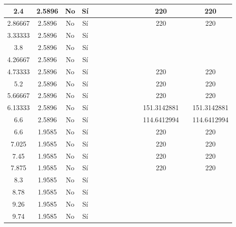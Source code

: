 \begin{table}[H]
{\begin{tabular}{|c|c|c|c|c|c|c|c|c|c|c|c|c|c|}
\hline
2.4 & 2.5896 & No  & Sí  &     &     &     &     &     &     &     & 220 &     & 220 \bigstrut\\
\hline
2.86667 & 2.5896 & No  & Sí  &     &     &     &     &     &     &     & 220 &     & 220 \bigstrut\\
\hline
3.33333 & 2.5896 & No  & Sí  &     &     &     &     &     &     &     &     &     &  \bigstrut\\
\hline
3.8 & 2.5896 & No  & Sí  &     &     &     &     &     &     &     &     &     &  \bigstrut\\
\hline
4.26667 & 2.5896 & No  & Sí  &     &     &     &     &     &     &     &     &     &  \bigstrut\\
\hline
4.73333 & 2.5896 & No  & Sí  &     &     &     &     &     &     &     & 220 &     & 220 \bigstrut\\
\hline
5.2 & 2.5896 & No  & Sí  &     &     &     &     &     &     &     & 220 &     & 220 \bigstrut\\
\hline
5.66667 & 2.5896 & No  & Sí  &     &     &     &     &     &     &     & 220 &     & 220 \bigstrut\\
\hline
6.13333 & 2.5896 & No  & Sí  &     &     &     &     &     &     &     & 151.3142881 &     & 151.3142881 \bigstrut\\
\hline
6.6 & 2.5896 & No  & Sí  &     &     &     &     &     &     &     & 114.6412994 &     & 114.6412994 \bigstrut\\
\hline
6.6 & 1.9585 & No  & Sí  &     &     &     &     &     &     &     & 220 &     & 220 \bigstrut\\
\hline
7.025 & 1.9585 & No  & Sí  &     &     &     &     &     &     &     & 220 &     & 220 \bigstrut\\
\hline
7.45 & 1.9585 & No  & Sí  &     &     &     &     &     &     &     & 220 &     & 220 \bigstrut\\
\hline
7.875 & 1.9585 & No  & Sí  &     &     &     &     &     &     &     & 220 &     & 220 \bigstrut\\
\hline
8.3 & 1.9585 & No  & Sí  &     &     &     &     &     &     &     &     &     &  \bigstrut\\
\hline
8.78 & 1.9585 & No  & Sí  &     &     &     &     &     &     &     &     &     &  \bigstrut\\
\hline
9.26 & 1.9585 & No  & Sí  &     &     &     &     &     &     &     &     &     &  \bigstrut\\
\hline
9.74 & 1.9585 & No  & Sí  &     &     &     &     &     &     &     &     &     &  \bigstrut\\

\end{tabular}}
\end{table}
